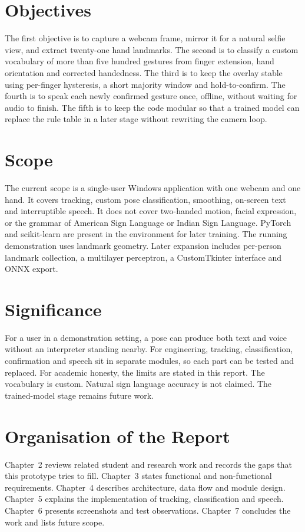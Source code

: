 \section{Objectives}
The first objective is to capture a webcam frame, mirror it for a natural selfie view, and extract twenty-one hand landmarks. The second is to classify a custom vocabulary of more than five hundred gestures from finger extension, hand orientation and corrected handedness. The third is to keep the overlay stable using per-finger hysteresis, a short majority window and hold-to-confirm. The fourth is to speak each newly confirmed gesture once, offline, without waiting for audio to finish. The fifth is to keep the code modular so that a trained model can replace the rule table in a later stage without rewriting the camera loop.

\section{Scope}
The current scope is a single-user Windows application with one webcam and one hand. It covers tracking, custom pose classification, smoothing, on-screen text and interruptible speech. It does not cover two-handed motion, facial expression, or the grammar of American Sign Language or Indian Sign Language. PyTorch and scikit-learn are present in the environment for later training. The running demonstration uses landmark geometry. Later expansion includes per-person landmark collection, a multilayer perceptron, a CustomTkinter interface and ONNX export.

\section{Significance}
For a user in a demonstration setting, a pose can produce both text and voice without an interpreter standing nearby. For engineering, tracking, classification, confirmation and speech sit in separate modules, so each part can be tested and replaced. For academic honesty, the limits are stated in this report. The vocabulary is custom. Natural sign language accuracy is not claimed. The trained-model stage remains future work.

\section{Organisation of the Report}
Chapter~2 reviews related student and research work and records the gaps that this prototype tries to fill. Chapter~3 states functional and non-functional requirements. Chapter~4 describes architecture, data flow and module design. Chapter~5 explains the implementation of tracking, classification and speech. Chapter~6 presents screenshots and test observations. Chapter~7 concludes the work and lists future scope.
